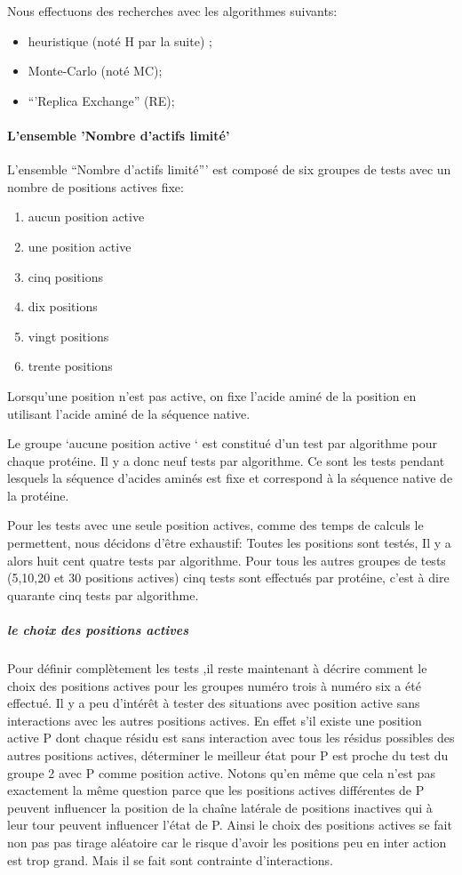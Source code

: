 Nous effectuons des recherches avec les algorithmes suivants:

\begin{itemize}
\item heuristique  (noté H par la suite) ;
\item Monte-Carlo (noté MC);
\item ``'Replica Exchange'' (RE);
\end{itemize}


\paragraph{L'ensemble 'Nombre d'actifs limité'}

L'ensemble ``Nombre d'actifs limité''' est composé de six groupes de tests avec un nombre de positions actives fixe:  


\begin{enumerate}
\item aucun position active
\item une position active 
\item cinq positions 
\item dix  positions 
\item vingt positions 
\item trente positions 
\end{enumerate}

Lorsqu'une position n'est pas active, on fixe l'acide aminé de la position en utilisant l'acide aminé de la séquence native.

Le groupe `aucune position active ` est constitué d'un test par algorithme pour chaque protéine. Il y a donc neuf tests par algorithme.
Ce sont les tests pendant lesquels  la séquence d'acides aminés est fixe et correspond à la séquence native de la protéine.

Pour les tests avec une seule position actives, comme des temps de calculs le permettent, nous décidons d'être exhaustif:
Toutes les positions sont testés, Il y a alors huit cent quatre tests par algorithme.
Pour tous les autres groupes de tests (5,10,20 et 30 positions actives) cinq tests sont effectués par protéine, c'est à dire quarante cinq tests par algorithme.

\subparagraph{le choix des positions actives}

Pour définir complètement les tests ,il reste maintenant à décrire comment le choix des positions actives pour les groupes numéro trois à numéro six a été effectué.
Il y a peu d'intérêt à tester des situations avec position active sans interactions avec les autres positions actives. 
En effet s'il existe une position active P dont chaque résidu est sans interaction avec tous les résidus possibles des autres positions actives, déterminer le meilleur état pour P est proche du test du groupe 2 avec P comme position active. Notons qu'en même que cela n'est pas exactement la même question parce que les positions actives différentes de P peuvent influencer la position de la chaîne latérale de positions inactives qui à leur tour peuvent influencer l'état de P.
Ainsi le choix des positions actives se fait non pas pas tirage aléatoire car le risque d'avoir les positions peu en inter action est trop grand. Mais il se fait sont contrainte d'interactions.
    

